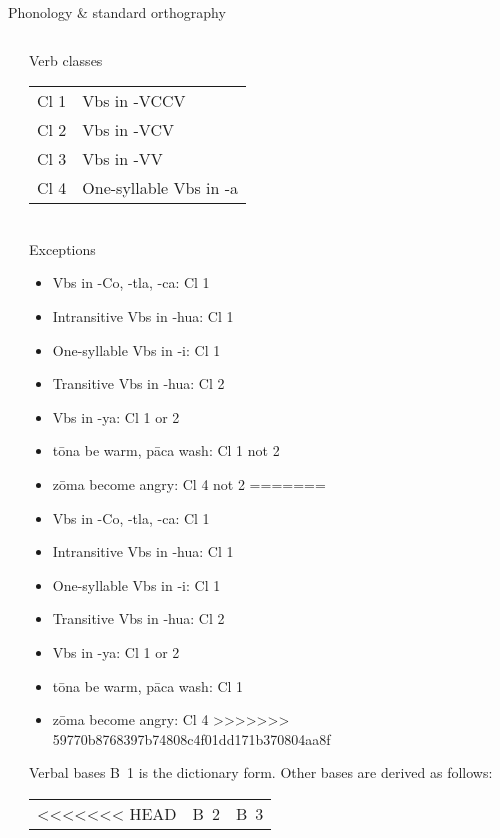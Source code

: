 \documentclass[12pt]{beamer}
\newcommand{\nah}[1]{\textcolor{nahgrn}{#1}}
\newcommand{\trs}[1]{\textcolor{nahblu}{#1}}
\begin{document}
\begin{frame}
\begin{columns}[t]
\begin{column}{.22\linewidth}
\begin{block}{Phonology \& standard orthography}
\begin{threeparttable}
\begin{tablenotes}
\begin{frame}
\begin{frame}
\begin{columns}[t]
\begin{column}{0.18\linewidth}
    \end{column}
    \begin{column}{.18\linewidth}
      \begin{block}{Verb classes}
        \begin{tabular}{ll}
          Cl 1 & Vbs in \nah{-VCCV}           \\
          Cl 2 & Vbs in \nah{-VCV}            \\
          Cl 3 & Vbs in \nah{-VV}             \\
          Cl 4 & One-syllable Vbs in \nah{-a}
        \end{tabular}\\
        Exceptions
        \begin{itemize}
<<<<<<< HEAD
        \item Vbs in \nah{-Co}, \nah{-tla}, \nah{-ca}: Cl 1
        \item Intransitive Vbs in \nah{-hua}: Cl 1
        \item One-syllable Vbs in \nah{-i}: Cl 1
        \item Transitive Vbs in \nah{-hua}: Cl 2
        \item Vbs in \nah{-ya}: Cl 1 or 2
        \item \nah{tōna} \trs{be warm}, \nah{pāca} \trs{wash}: Cl 1 not 2
        \item \nah{zōma} \trs{become angry}: Cl 4 not 2
=======
          \item Vbs in \nah{-Co}, \nah{-tla}, \nah{-ca}: Cl 1
          \item Intransitive Vbs in \nah{-hua}: Cl 1
          \item One-syllable Vbs in \nah{-i}: Cl 1
          \item Transitive Vbs in \nah{-hua}: Cl 2
          \item Vbs in \nah{-ya}: Cl 1 or 2
          \item \nah{tōna} \trs{be warm}, \nah{pāca} \trs{wash}: Cl 1
          \item \nah{zōma} \trs{become angry}: Cl 4
>>>>>>> 59770b8768397b74808c4f01dd171b370804aa8f
        \end{itemize}
      \end{block}
      \begin{block}{Verbal bases}
        B~1 is the dictionary form. Other bases are derived as follows:
        \begin{tabular}{lll}
<<<<<<< HEAD
          & B~2               & B~3               \\

\end{tabular}
\end{block}
\end{column}
\end{columns}
\end{frame}
\end{frame}
\end{tablenotes}
\end{threeparttable}
\end{block}
\end{column}
\end{columns}
\end{frame}
\end{document}
